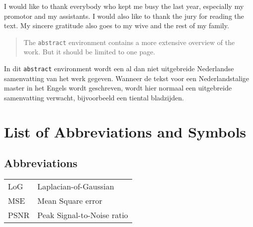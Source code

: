 \documentclass[master=elt,masteroption=eg,english]{kulemt}
\begin{document}
	
	\begin{preface}
		I would like to thank everybody who kept me busy the last year,
		especially my promotor and my assistants. I would also like to thank the
		jury for reading the text. My sincere gratitude also goes to my wive and
		the rest of my family.
	\end{preface}
	
	\tableofcontents*
	
	\begin{abstract}
		The \texttt{abstract} environment contains a more extensive overview of
		the work. But it should be limited to one page.
		
		\lipsum[1]
	\end{abstract}
	
	\begin{abstract*}
		In dit \texttt{abstract} environment wordt een al dan niet uitgebreide
		Nederlandse samenvatting van het werk gegeven.
		Wanneer de tekst voor een Nederlandstalige master in het Engels wordt
		geschreven, wordt hier normaal een uitgebreide samenvatting verwacht,
		bijvoorbeeld een tiental bladzijden. 
		
		\lipsum[1]
	\end{abstract*}
	
	\listoffiguresandtables
	\chapter{List of Abbreviations and Symbols}
	\section*{Abbreviations}
	\begin{flushleft}
		\renewcommand{\arraystretch}{1.1}
		\begin{tabularx}{\textwidth}{@{}p{12mm}X@{}}
			LoG   & Laplacian-of-Gaussian \\
			MSE   & Mean Square error \\
			PSNR  & Peak Signal-to-Noise ratio \\
		\end{tabularx}
	\end{flushleft}
\end{document}
